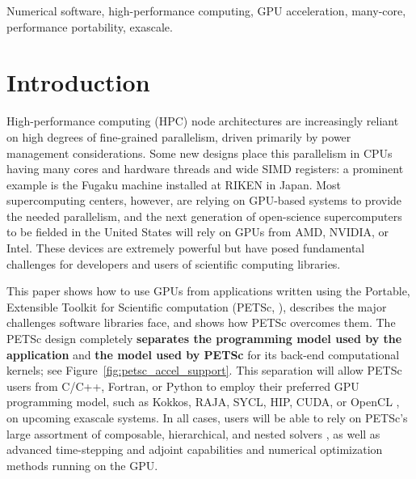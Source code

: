 \documentclass[10pt,journal,compsoc]{IEEEtran}
\begin{document}
\begin{IEEEkeywords}
Numerical software, high-performance computing, GPU acceleration, many-core, performance portability, exascale.
\end{IEEEkeywords}

\linenumbers

\section{Introduction}

High-performance computing (HPC) node architectures are increasingly reliant on
high degrees of fine-grained parallelism, 
driven primarily by power management considerations.
Some new designs place this parallelism in CPUs having many 
cores and hardware threads and wide SIMD registers:
a prominent example is the Fugaku machine installed at RIKEN in Japan.
Most supercomputing centers, however, are relying on GPU-based systems to provide the
needed parallelism, and the next generation of open-science supercomputers to be fielded in
the United States will rely on GPUs from AMD, NVIDIA, or Intel.
These devices are extremely powerful but have posed fundamental challenges for developers and
users of scientific computing libraries.

This paper shows how to use GPUs from applications written using the
Portable, Extensible Toolkit for Scientific computation (PETSc,
\cite{petsc-user-ref}), describes
 the major challenges software libraries face, and shows how PETSc overcomes them.
The PETSc design completely {\bf separates the programming
model used by the application} and {\bf the model used by PETSc}
for its back-end computational kernels; see
Figure~\ref{fig:petsc_accel_support}.
This separation  will allow PETSc users from C/C++, Fortran, or Python to employ their preferred 
GPU programming model, such as Kokkos, RAJA, SYCL, HIP, CUDA, 
or OpenCL \cite{KOKKOS,RAJA,SYCL,CUDA,HIP,OPENCL}, on 
upcoming exascale systems.
%  
In all cases, users will be able to rely on PETSc's large assortment of composable, hierarchical, and nested
solvers \cite{bkmms2012}, as well as advanced time-stepping and adjoint
capabilities and numerical optimization methods running on the GPU.
\end{document}

